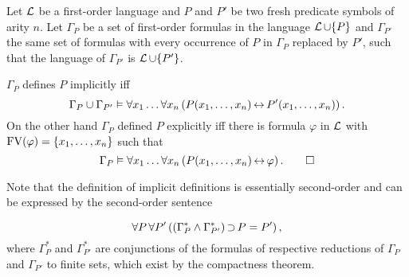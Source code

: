 \begin{defi}
	Let $\operatorname{\mathcal{L}}$ be a first-order language and
	$P$ and $P'$ be two fresh predicate symbols of arity $n$.
	Let $\Gamma_P$ be a set of first-order formulas
	in the language $\operatorname{\mathcal{L}}\cup\{P\}$ 
	and $\Gamma_{P'}$ the same set of formulas with every occurrence of $P$ in $\Gamma_P$ replaced by\nolinebreak{} $P'$, such that the language of $\Gamma_{P'}$ is $\operatorname{\mathcal{L}} \cup\{P'\}$.

	$\Gamma_P$ defines $P$ implicitly iff
	\[\Gamma_P \cup \Gamma_{P'} \vDash \forall x_1\dots \forall x_n \left(  P(x_1, \dots, x_n) \operatorname{\leftrightarrow} P'(x_1, \dots, x_n)\right).\]
	On the other hand $\Gamma_P$ defined $P$ explicitly iff there is formula $\varphi$ in $\operatorname{\mathcal{L}}$ with $\operatorname{FV}(\varphi) = \{x_1, \dots, x_n\}$ such that 
	\[\Gamma_P\vDash \forall x_1\dots \forall x_n \left(  P(x_1, \dots, x_n) \operatorname{\leftrightarrow} \varphi\right).\qedhere\]
\end{defi}

Note that the definition of implicit definitions is essentially second-order 
and 
can be expressed by the second-order sentence
\begin{samepage}
\[ \forall P\,\forall P' \left(  \left(\Gamma^*_P \land \Gamma^*_{P'} \right) \operatorname{\supset} P=P'\right),\] 
where $\Gamma^*_P$ and $\Gamma^*_{P'}$ are conjunctions of the formulas of 
respective reductions of $\Gamma_P$ and $\Gamma_{P'}$ 
to finite sets, which exist by the compactness theorem.
\end{samepage}

